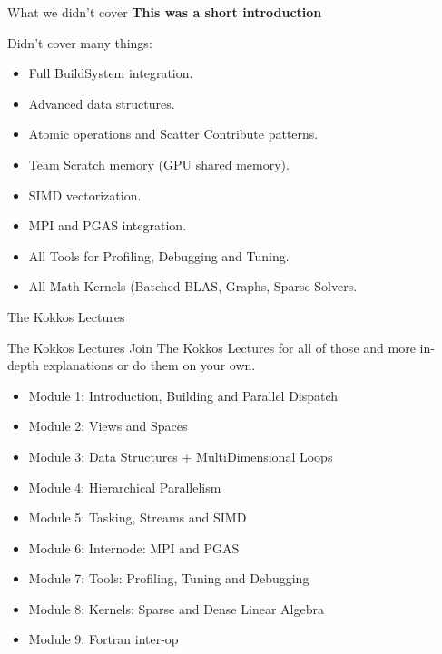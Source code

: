 \begin{frame}[fragile]{What we didn't cover}
	\textbf{This was a short introduction}
	
	Didn't cover many things:
	\begin{itemize}
		\item<2-> Full BuildSystem integration.
		\item<3-> Advanced data structures.
		\item<4-> Atomic operations and Scatter Contribute patterns.
		\item<5-> Team Scratch memory (GPU shared memory).
		\item<6-> SIMD vectorization.
		\item<7-> MPI and PGAS integration.
		\item<8-> All Tools for Profiling, Debugging and Tuning.
    \item<9-> All Math Kernels (Batched BLAS, Graphs, Sparse Solvers.
	\end{itemize}

\end{frame}

\begin{frame}{The Kokkos Lectures}
        
	\begin{block}{The Kokkos Lectures}
		Join The Kokkos Lectures for all of those and more in-depth explanations or do them on your own.
	\end{block}

\begin{itemize}
	\item Module 1: Introduction, Building and Parallel Dispatch
	\item Module 2: Views and Spaces
	\item Module 3: Data Structures + MultiDimensional Loops
	\item Module 4: Hierarchical Parallelism
	\item Module 5: Tasking, Streams and SIMD
	\item Module 6: Internode: MPI and PGAS
	\item Module 7: Tools: Profiling, Tuning and Debugging
	\item Module 8: Kernels: Sparse and Dense Linear Algebra
    \item Module 9: Fortran inter-op
\end{itemize}
\end{frame}

